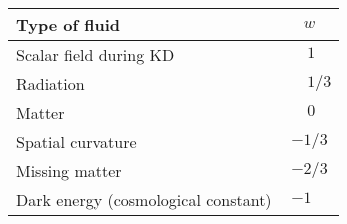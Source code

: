 \begin{tabular}{lc}
  \toprule
  Type of fluid & \(w\) \\
  \midrule
  Scalar field during KD & \( \phantom{-}1\phantom{/3} \) \\
  Radiation & \( \phantom{-}1/3 \) \\
  Matter & \( \phantom{-}0\phantom{/3} \) \\
  Spatial curvature & \( -1/3\) \\
  Missing matter & \( -2/3\) \\
  Dark energy (cosmological constant) & \( -1\phantom{/3} \) \\
  \bottomrule
\end{tabular}
